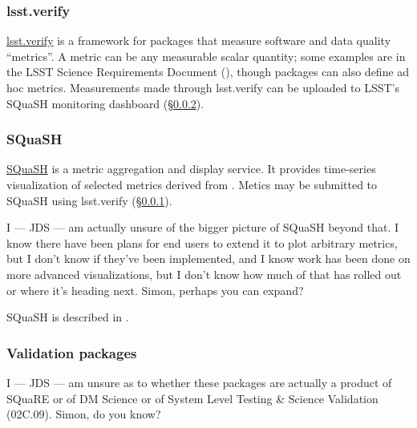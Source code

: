 \documentclass[DM,authoryear,toc,lsstdraft]{lsstdoc}
\begin{document}
\subsubsection{lsst.verify}
\label{sec:current:square:verify}


\href{https://github.com/lsst/verify}{lsst.verify} is a framework for packages
that measure software and data quality ``metrics''. A metric can be any
measurable scalar quantity; some examples are in the LSST Science Requirements
Document (), though packages can also define ad hoc metrics.
Measurements made through lsst.verify can be uploaded to LSST's SQuaSH
monitoring dashboard (\S\ref{sec:current:square:squash}).

\subsubsection{SQuaSH}
\label{sec:current:square:squash}

\href{https://squash.lsst.codes}{SQuaSH} is a metric aggregation and display
service. It provides time-series visualization of selected metrics derived
from . Metics may be submitted to SQuaSH using lsst.verify
(\S\ref{sec:current:square:verify}).

\begin{draftnote}
I --- JDS --- am actually unsure of the bigger picture of SQuaSH beyond that.
I know there have been plans for end users to extend it to plot arbitrary
metrics, but I don't know if they've been implemented, and I know work has
been done on more advanced visualizations, but I don't know how much of that
has rolled out or where it's heading next. Simon, perhaps you can expand?
\end{draftnote}

SQuaSH is described in .

\subsubsection{Validation packages}
\label{sec:current:square:validate}

\begin{draftnote}
I --- JDS --- am unsure as to whether these packages are actually a product of
SQuaRE or of DM Science or of System Level Testing \& Science Validation
(02C.09). Simon, do you know?
\end{draftnote}
\end{document}
